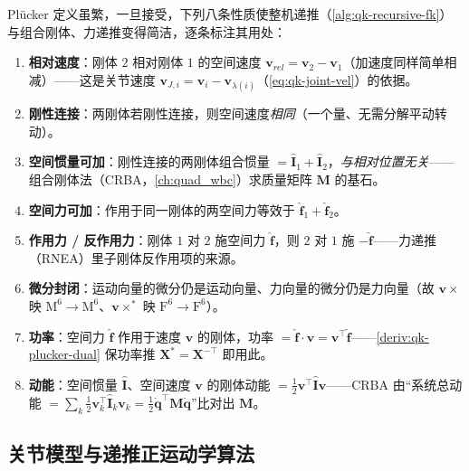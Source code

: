 \begin{note}\label{note:qk-spatial-props}
Plücker 定义虽繁，一旦接受，下列八条性质使整机递推（\cref{alg:qk-recursive-fk}）与组合刚体、力递推变得简洁，逐条标注其用处\cite{yu2021quadruped}：
\begin{enumerate}
  \item \textbf{相对速度}：刚体 $2$ 相对刚体 $1$ 的空间速度 $\boldsymbol{v}_{rel}=\boldsymbol{v}_2-\boldsymbol{v}_1$（加速度同样简单相减）——这是关节速度 $\boldsymbol{v}_{J,i}=\boldsymbol{v}_i-\boldsymbol{v}_{\lambda(i)}$（\cref{eq:qk-joint-vel}）的依据。
  \item \textbf{刚性连接}：两刚体若刚性连接，则空间速度\emph{相同}（一个量、无需分解平动转动）。
  \item \textbf{空间惯量可加}：刚性连接的两刚体组合惯量 $=\hat{\mathbf{I}}_1+\hat{\mathbf{I}}_2$，\emph{与相对位置无关}——组合刚体法（CRBA，\cref{ch:quad_wbc}）求质量矩阵 $\mathbf{M}$ 的基石。
  \item \textbf{空间力可加}：作用于同一刚体的两空间力等效于 $\hat{\boldsymbol{f}}_1+\hat{\boldsymbol{f}}_2$。
  \item \textbf{作用力 / 反作用力}：刚体 $1$ 对 $2$ 施空间力 $\hat{\boldsymbol{f}}$，则 $2$ 对 $1$ 施 $-\hat{\boldsymbol{f}}$——力递推（RNEA）里子刚体反作用项的来源。
  \item \textbf{微分封闭}：运动向量的微分仍是运动向量、力向量的微分仍是力向量（故 $\boldsymbol{v}\times$ 映 $\mathrm{M}^6\!\to\!\mathrm{M}^6$、$\boldsymbol{v}\times^{*}$ 映 $\mathrm{F}^6\!\to\!\mathrm{F}^6$）。
  \item \textbf{功率}：空间力 $\hat{\boldsymbol{f}}$ 作用于速度 $\boldsymbol{v}$ 的刚体，功率 $=\hat{\boldsymbol{f}}\cdot\boldsymbol{v}=\boldsymbol{v}^\top\hat{\boldsymbol{f}}$——\cref{deriv:qk-plucker-dual} 保功率推 $\mathbf{X}^{*}=\mathbf{X}^{-\top}$ 即用此。
  \item \textbf{动能}：空间惯量 $\hat{\mathbf{I}}$、空间速度 $\boldsymbol{v}$ 的刚体动能 $=\tfrac12\boldsymbol{v}^\top\hat{\mathbf{I}}\boldsymbol{v}$——CRBA 由“系统总动能 $=\sum_k\tfrac12\boldsymbol{v}_k^\top\hat{\mathbf{I}}_k\boldsymbol{v}_k=\tfrac12\dot{\boldsymbol{q}}^\top\mathbf{M}\dot{\boldsymbol{q}}$”比对出 $\mathbf{M}$。
\end{enumerate}
\end{note}

\subsection{关节模型与递推正运动学算法}
\label{subsec:qk-recursive-fk}

